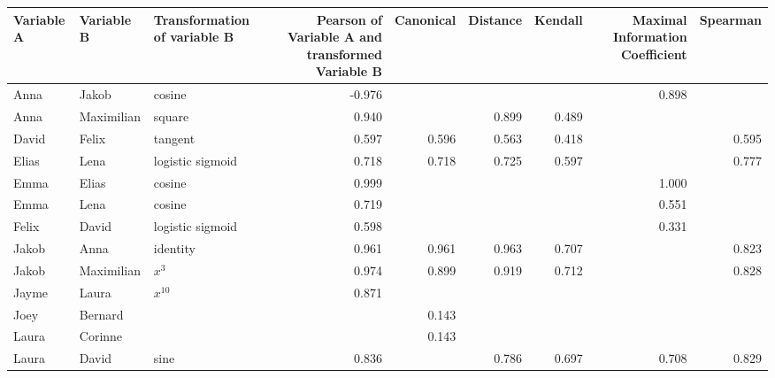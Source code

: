 \begin{table}[ht!]
\begin{tabular}{|l|l|l|r|r|r|r|r|r|}
\hline
Variable A & Variable B &            Transformation of variable B &  Pearson of Variable A and transformed Variable B &  Canonical &  Distance &  Kendall &  Maximal Information Coefficient &  Spearman \\
\hline
      Anna &      Jakob &                                  cosine & -0.976 &            &           &          & 0.898 &  ~    \\[0.25cm]
      Anna & Maximilian &                                  square &  0.940 &            &     0.899 &    0.489 &       &  ~    \\[0.25cm]
     David &      Felix &                                 tangent &  0.597 &      0.596 &     0.563 &    0.418 &       & 0.595 \\[0.25cm]
     Elias &       Lena &                        logistic sigmoid &  0.718 &      0.718 &     0.725 &    0.597 &       & 0.777 \\[0.25cm]
      Emma &      Elias &                                  cosine &  0.999 &            &           &          & 1.000 &  ~    \\[0.25cm]
      Emma &       Lena &                                  cosine &  0.719 &            &           &          & 0.551 &  ~    \\[0.25cm]
     Felix &      David &                        logistic sigmoid &  0.598 &            &           &          & 0.331 &  ~    \\[0.25cm]
     Jakob &       Anna &                                identity &  0.961 &      0.961 &     0.963 &    0.707 &       & 0.823 \\[0.25cm]
     Jakob & Maximilian &                                 $x ^ 3$ &  0.974 &      0.899 &     0.919 &    0.712 &       & 0.828 \\[0.25cm]
     Jayme &      Laura &                               $x ^{10}$ &  0.871 &            &           &          &       &  ~    \\[0.25cm]
      Joey &    Bernard &                                         &        &      0.143 &           &          &       &  ~    \\[0.25cm]
     Laura &    Corinne &                                         &        &      0.143 &           &          &       &  ~    \\[0.25cm]
     Laura &      David &                                    sine &  0.836 &            &     0.786 &    0.697 & 0.708 & 0.829 \\[0.25cm]

\end{tabular}
\end{table}
